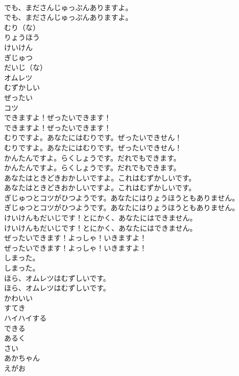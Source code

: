 \documentclass[8pt]{extreport}
\begin{document}
\begin{CJK}{UTF8}{min}
\\	でも、まださんじゅっぷんありますよ。	
\\	でも、まださんじゅっぷんありますよ。 
\\	むり（な）
\\	りょうほう
\\	けいけん
\\	ぎじゅつ
\\	だいじ（な）
\\	オムレツ
\\	むずかしい
\\	ぜったい
\\	コツ
\\	できますよ！ぜったいできます！	
\\	できますよ！ぜったいできます！ 
\\	むりですよ。あなたにはむりです。ぜったいできせん！	
\\	むりですよ。あなたにはむりです。ぜったいできせん！ 
\\	かんたんですよ。らくしょうです。だれでもできます。	
\\	かんたんですよ。らくしょうです。だれでもできます。 
\\	あなたはときどきおかしいですよ。これはむずかしいです。	
\\	あなたはときどきおかしいですよ。これはむずかしいです。 
\\	ぎじゅつとコツがひつようです。あなたにはりょうほうともありません。	
\\	ぎじゅつとコツがひつようです。あなたにはりょうほうともありません。 
\\	けいけんもだいじです！とにかく、あなたにはできません。	
\\	けいけんもだいじです！とにかく、あなたにはできません。 
\\	ぜったいできます！よっしゃ！いきますよ！	
\\	ぜったいできます！よっしゃ！いきますよ！ 
\\	しまった。	
\\	しまった。 
\\	ほら、オムレツはむずしいです。	
\\	ほら、オムレツはむずしいです。 
\\	かわいい
\\	すてき
\\	ハイハイする
\\	できる
\\	あるく
\\	さい
\\	あかちゃん
\\	えがお

\end{CJK}
\end{document}
